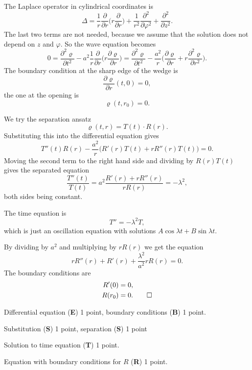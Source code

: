 \begin{loesung}
\begin{teilaufgaben}
\item
The Laplace operator in cylindrical coordinates is
\[
\Delta = 
\frac{1}{r}\frac{\partial}{\partial r}
\biggl(r\frac{\partial}{\partial r}\biggr)
+
\frac1{r^2}\frac{\partial^2}{\partial \varphi^2}
+
\frac{\partial^2}{\partial z^2}.
\]
The last two terms are not needed, because we assume that the solution
does not depend on $z$ and $\varphi$.
So the wave equation becomes
\[
0
=
\frac{\partial^2\varrho}{\partial t^2}
-
a^2\frac1r\frac{\partial}{\partial r}\biggl(r\frac{\partial\varrho}{\partial r}\biggr)
=
\frac{\partial^2\varrho}{\partial t^2}
-
\frac{a^2}{r}
\biggl(
\frac{\partial\varrho}{\partial r}
+
r
\frac{\partial^2\varrho}{\partial r^2}
\biggr).
\]
The boundary condition at the sharp edge of the wedge is
\[
\frac{\partial\varrho}{\partial r}(t,0)=0,
\]
the one at the opening is
\[
\varrho(t, r_0) = 0.
\]
\item
We try the separation ansatz
\[
\varrho(t,r) = T(t) \cdot R(r).
\]
Substituting this into the differential equation gives
\[
T''(t) R(r) - \frac{a^2}r\bigl(R'(r)T(t) + rR''(r)T(t)\bigr) = 0.
\]
Moving the second term to the right hand side and dividing by $R(r)T(t)$
gives the separated equation
\[
\frac{T''(t)}{T(t)}
=
a^2 \frac{R'(r)+rR''(r)}{rR(r)}
=
-\lambda^2,
\]
both sides being constant.
\item
The time equation is 
\[
T'' = -\lambda^2 T,
\]
which is just an oscillation equation with solutions
$A\cos\lambda t+B\sin\lambda t$.
\item
By dividing by $a^2$ and multiplying by $rR(r)$ we get the equation
\[
rR''(r) + R'(r) +\frac{\lambda^2}{a^2}rR(r)=0.
\]
The boundary conditions are
\begin{align*}
R'(0) &= 0,\\
R(r_0) &= 0.
\qedhere
\end{align*}
\end{teilaufgaben}
\end{loesung}

\begin{bewertung}
\begin{teilaufgaben}
\item Differential equation ({\bf E}) 1 point,
boundary conditions ({\bf B}) 1 point.
\item
Substitution ({\bf S}) 1 point,
separation ({\bf S}) 1 point
\item
Solution to time equation ({\bf T}) 1 point.
\item
Equation with boundary conditions for $R$ ({\bf R}) 1 point.
\end{teilaufgaben}
\end{bewertung}

